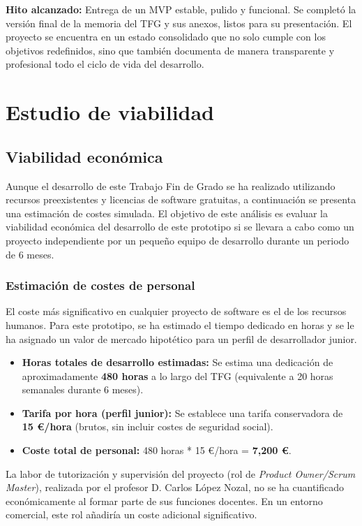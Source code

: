 \item \textbf{Hito alcanzado:} Entrega de un MVP estable, pulido y funcional. Se completó la versión final de la memoria del TFG y sus anexos, listos para su presentación. El proyecto se encuentra en un estado consolidado que no solo cumple con los objetivos redefinidos, sino que también documenta de manera transparente y profesional todo el ciclo de vida del desarrollo. 

\section{Estudio de viabilidad}
\subsection{Viabilidad económica}
Aunque el desarrollo de este Trabajo Fin de Grado se ha realizado utilizando recursos preexistentes y licencias de software gratuitas, a continuación se presenta una estimación de costes simulada. El objetivo de este análisis es evaluar la viabilidad económica del desarrollo de este prototipo si se llevara a cabo como un proyecto independiente por un pequeño equipo de desarrollo durante un periodo de 6 meses.

\subsubsection{Estimación de costes de personal}
El coste más significativo en cualquier proyecto de software es el de los recursos humanos. Para este prototipo, se ha estimado el tiempo dedicado en horas y se le ha asignado un valor de mercado hipotético para un perfil de desarrollador junior.

\begin{itemize}
	\item \textbf{Horas totales de desarrollo estimadas:} Se estima una dedicación de aproximadamente \textbf{480 horas} a lo largo del TFG (equivalente a 20 horas semanales durante 6 meses).
	\item \textbf{Tarifa por hora (perfil junior):} Se establece una tarifa conservadora de \textbf{15 €/hora} (brutos, sin incluir costes de seguridad social).
	\item \textbf{Coste total de personal:} 480 horas * 15 €/hora = \textbf{7,200 €}.
\end{itemize}

La labor de tutorización y supervisión del proyecto (rol de \textit{Product Owner/Scrum Master}), realizada por el profesor D. Carlos López Nozal, no se ha cuantificado económicamente al formar parte de sus funciones docentes. En un entorno comercial, este rol añadiría un coste adicional significativo.

